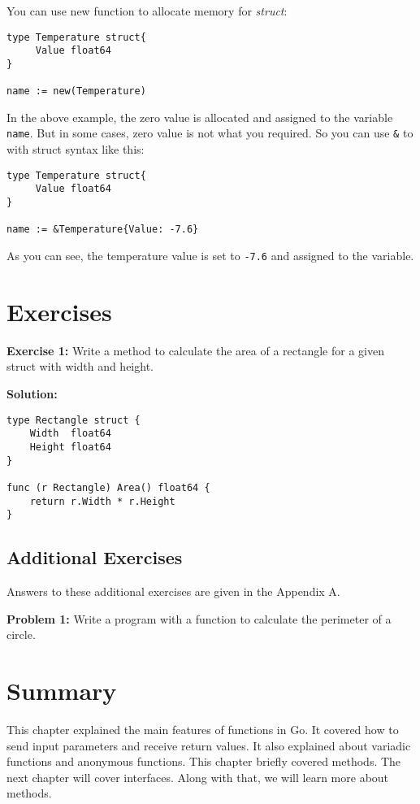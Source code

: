 You can use new function to allocate memory for \textit{struct}:

\begin{lstlisting}[numbers=none]
type Temperature struct{
     Value float64
}

name := new(Temperature)
\end{lstlisting}

In the above example, the zero value is allocated and assigned to the
variable \texttt{name}.  But in some cases, zero value is not what you
required.  So you can use \texttt{\&} to with struct syntax like this:

\begin{lstlisting}[numbers=none]
type Temperature struct{
     Value float64
}

name := &Temperature{Value: -7.6}
\end{lstlisting}

As you can see, the temperature value is set to \texttt{-7.6} and
assigned to the variable.

\section{Exercises}

\textbf{Exercise 1:} Write a method to calculate the area of a rectangle for a
given struct with width and height.

\textbf{Solution:}

\begin{lstlisting}[numbers=none]
type Rectangle struct {
    Width  float64
    Height float64
}

func (r Rectangle) Area() float64 {
    return r.Width * r.Height
}
\end{lstlisting}

\subsection{Additional Exercises}

Answers to these additional exercises are given in the Appendix A.

\textbf{Problem 1:} Write a program with a function to calculate the perimeter of a circle.

\section*{Summary}

This chapter explained the main features of functions in Go. It covered how to
send input parameters and receive return values. It also explained about
variadic functions and anonymous functions. This chapter briefly covered
methods. The next chapter will cover interfaces. Along with that, we will learn
more about methods.

